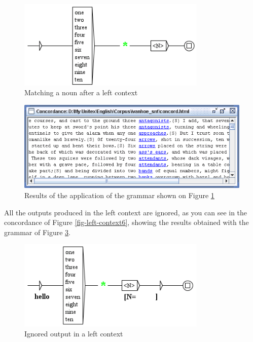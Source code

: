 \begin{figure}[!ht]
\begin{center}
\includegraphics[width=9cm]{resources/img/fig6-17c.png}
\caption{Matching a noun after a left context\label{fig-left-context3}}
\end{center}
\end{figure}

\begin{figure}[!ht]
\begin{center}
\includegraphics[width=14cm]{resources/img/fig6-17d.png}
\caption{Results of the application of the grammar shown on Figure
\ref{fig-left-context3}\label{fig-left-context4}}
\end{center}
\end{figure}

\clearpage
\noindent All the outputs produced in the left context are ignored, as you can
see in the concordance of Figure \ref{fig-left-context6}, showing the results
obtained with the grammar of Figure \ref{fig-left-context5}.

\begin{figure}[!ht]
\begin{center}
\includegraphics[width=9cm]{resources/img/fig6-17e.png}
\caption{Ignored output in a left context\label{fig-left-context5}}
\end{center}
\end{figure}

